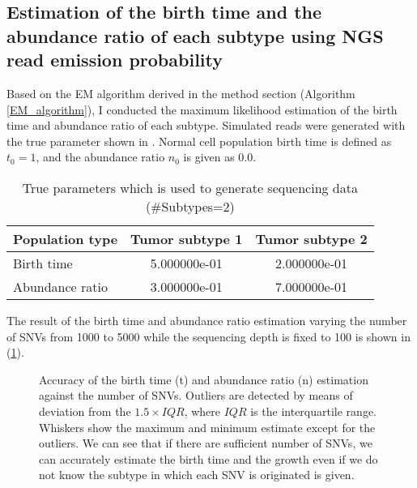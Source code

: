 \documentclass{article}
\begin{document}
\subsection{Estimation of the birth time and the abundance ratio of each subtype using NGS read emission probability}
Based on the EM algorithm derived in the method section (Algorithm \ref{EM_algorithm}), I conducted the maximum likelihood estimation of the birth time and abundance ratio of each subtype.
Simulated reads were generated with the true parameter shown in . Normal cell population birth time is defined as $t_{0}=1$, and the abundance ratio $n_{0}$ is given as 0.0.

\begin{table}[H]
\begin{center}
 \caption{True parameters which is used to generate sequencing data (\#Subtypes=2)}
 \label{tab: true_parameters_0.5_0.4_3}
  \begin{tabular}[t]{lcc}\toprule
  Population type & Tumor subtype 1 & Tumor subtype 2\\\midrule
   Birth time & 5.000000e-01 & 2.000000e-01\\
   Abundance ratio & 3.000000e-01 & 7.000000e-01\\\bottomrule
 \end{tabular}
\end{center}
\end{table}

The result of the birth time and abundance ratio estimation varying the number of SNVs from 1000 to 5000 while the sequencing depth is fixed to 100 is shown in (\ref{fig: read_emission_snv}).

\begin{figure}[H]
   \caption{
 Accuracy of the birth time (t) and abundance ratio (n) estimation against the number of SNVs. Outliers are detected by means of deviation from the $1.5 \times IQR$, where $IQR$ is the interquartile range. Whiskers show the maximum and minimum estimate except for the outliers. We can see that if there are sufficient number of SNVs, we can accurately estimate the birth time and the growth even if we do not know the subtype in which each SNV is originated is given.
  }
 \label{fig: read_emission_snv}
\end{figure}
\end{document}
